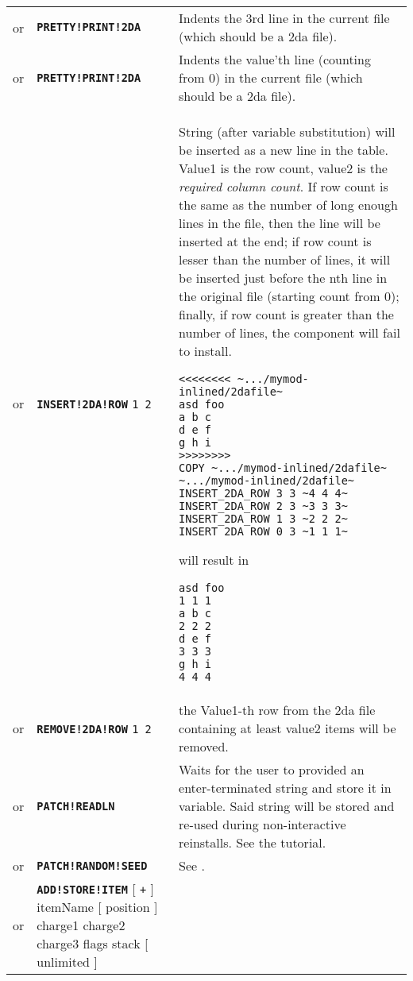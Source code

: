 \documentclass{article}
\def\ttref#1{\ahrefloc{#1}{\tt #1}}
\def\DEFINE#1{{\tt \bf #1}\label{#1}\index{#1}}
\def\DEFSYN#1{{\tt \bf #1}\index{#1}}
\def\t#1{{\tt #1}}
\def\Ob{{\color{red} [ }}
\def\Oe{{\color{red} ] }}
\begin{document}
\begin{tabular}{cp{10in}|p{10in}}
or & \DEFINE{PRETTY!PRINT!2DA} & Indents the 3rd line in the current file (which
  should be a  2da file). \\
or & \DEFSYN{PRETTY!PRINT!2DA} \ttref{value} & Indents the value'th line
(counting from 0) in the current file (which should be a 2da file). \\
or & \DEFINE{INSERT!2DA!ROW} \t{\ttref{value}1 \ttref{value}2 \ttref{String}} &
  String (after variable substitution) will be inserted as a new line in the table.
  Value1 is the row count, value2 is the \emph{required column count}. If row count is
  the same as the number of long enough lines in the file, then the line will be inserted
  at the end; if row count is lesser than the number of lines, it will be inserted just before
  the nth line in the original file (starting count from 0); finally, if row count is greater
  than the number of lines, the component will fail to install.
\begin{verbatim}
<<<<<<<< ~.../mymod-inlined/2dafile~
asd foo
a b c
d e f
g h i
>>>>>>>>
COPY ~.../mymod-inlined/2dafile~ ~.../mymod-inlined/2dafile~
INSERT_2DA_ROW 3 3 ~4 4 4~
INSERT_2DA_ROW 2 3 ~3 3 3~
INSERT_2DA_ROW 1 3 ~2 2 2~
INSERT_2DA_ROW 0 3 ~1 1 1~
\end{verbatim}
will result in
\begin{verbatim}
asd foo
1 1 1
a b c
2 2 2
d e f
3 3 3
g h i
4 4 4
\end{verbatim} \\
or & \DEFINE{REMOVE!2DA!ROW} \t{\ttref{value}1 \ttref{value}2} &
  the Value1-th row from the 2da file containing at least value2 items will be removed.
\\
or & \DEFINE{PATCH!READLN} \ttref{variable} &
  Waits for the user to provided an enter-terminated string and store it in
  variable. Said string will be stored and re-used during non-interactive reinstalls. See the
  \ttref{READLN} tutorial. \\
or & \DEFINE{PATCH!RANDOM!SEED} \ttref{value} &
  See \ttref{RANDOM!SEED}. \\
or & \DEFINE{ADD!STORE!ITEM} \Ob \t{+} \Oe itemName \Ob position \Oe
  charge1 charge2 charge3 flags stack \Ob unlimited \Oe &


\end{tabular}
\end{document}
